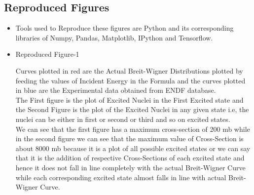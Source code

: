 \documentclass{article}
\begin{document}
\subsection{Reproduced Figures}
\begin{itemize}
\item Tools used to Reproduce these figures are Python and its corresponding libraries of Numpy\cite{citenp}, Pandas\cite{citepd}, Matplotlib\cite{citeplt}, IPython\cite{citeipy} and Tensorflow\cite{citetf}.
\item Reproduced Figure-1\\
  \begin{figure}[htp]
    \centering
    \hfill%
  \end{figure}
  Curves plotted in red are the Actual Breit-Wigner Distributions plotted by feeding the values of Incident Energy in the Formula and the curves plotted in blue are the Experimental data obtained from ENDF database.\\
  The First figure is the plot of Excited Nuclei in the First Excited state and the Second Figure is the plot of the Excited Nuclei in any given state i.e, the nuclei can be either in first or second or third and so on excited states.\\
  We can see that the first figure has a maximum cross-section of 200 mb while in the second figure we can see that the maximum value of Cross-Section is about 8000 mb because it is a plot of all possible excited states or we can say that it is the addition of respective Cross-Sections of each excited state and hence it does not fall in line completely with the actual Breit-Wigner Curve while each corresponding excited state almost falls in line with actual Breit-Wigner Curve.


\end{itemize}
\end{document}
